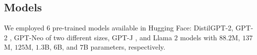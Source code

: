 \documentclass[letterpaper]{article} %
\newcommand{\goncalo}[1]
{\textcolor{orange}{{\bf}{\em #1}{\bf}}}
\begin{document}
\subsection{Models}\label{sec:models}

We employed $6$ pre-trained models available in Hugging Face: DistilGPT-2, GPT-2 \cite{radford2019language}, GPT-Neo \cite{gpt-neo} of two different sizes, GPT-J \cite{gpt-j}, and Llama $2$ \cite{touvron2023llama} models with $88.2$M, $137$M, $125$M, $1.3$B, $6$B, and $7$B parameters, respectively.
\end{document}
